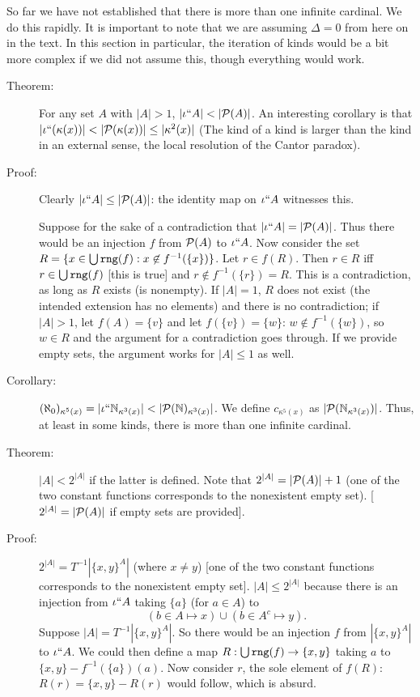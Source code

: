\documentclass[12pt]{article}
\begin{document}
So far we have not established that there is more than one infinite cardinal.  We do this rapidly.  It is important to note that we are assuming $\Delta=0$ from here on in the text.  In this section in particular, the iteration of kinds would be a bit more complex if we did not assume this, though everything would work.

\begin{description}

\item[Theorem:]  For any set $A$ with $|A|>1$, $|\iota``A|<|{\cal P}(A)|$.  An interesting corollary is that $|\iota``(\kappa(x))| < |{\cal P}(\kappa(x))| \leq |\kappa^2(x)|$ (The kind of a kind is larger than the kind in an external sense, the local resolution of the Cantor paradox).

\item[Proof:]  Clearly $|\iota``A|\leq |{\cal P}(A)|$:  the identity map on $\iota``A$ witnesses this.

Suppose for the sake of a contradiction that $|\iota``A|=|{\cal P}(A)|$.  Thus there would be an injection $f$ from ${\cal P}(A)$ to $\iota``A$.  Now consider the set $R = \{x \in \bigcup {\tt rng}(f):x \not\in f^{-1}(\{x\})\}$.  Let $r \in f(R)$.  Then $r \in R$ iff \newline $r \in \bigcup {\tt rng}(f)$ [this is true] and $r \not\in f^{-1}(\{r\}) = R$.  This is a contradiction, as long as $R$ exists (is nonempty).  If $|A|=1$, $R$ does not exist (the intended extension has no elements) and there is no contradiction;
if $|A|>1$, let $f(A)=\{v\}$ and let $f(\{v\}) = \{w\}$:  $w \not\in f^{-1}(\{w\})$, so $w \in R$ and the argument for a contradiction goes through.  If we provide empty sets, the argument works for $|A| \leq 1$ as well.

\item[Corollary:]  $(\aleph_0)_{\kappa^5(x)} = |\iota``{\mathbb N}_{\kappa^3(x)}| < |{\cal P}(\mathbb N)_{\kappa^3(x)}|$.  We define $c_{\kappa^5(x)}$ as $|{\cal P}(\mathbb N_{\kappa^3(x)})|$.  Thus, at least in some kinds, there is more than one infinite cardinal.

\item[Theorem:] $|A|<2^{|A|}$ if the latter is defined.  Note that $2^{|A|}=|{\cal P}(A)|+1$ (one of the two constant functions corresponds to the nonexistent empty set). [$2^{|A|}=|{\cal P}(A)|$ if empty sets are provided].

\item[Proof:]  $2^{|A|}= T^{-1}|\{x,y\}^A|$ (where $x \neq y$) [one of the two constant functions corresponds to the nonexistent empty set].  $|A| \leq 2^{|A|}$ because there is an injection  from $\iota``A$ taking $\{a\}$ (for $a \in A$) to $$(b \in A \mapsto x) \cup (b \in A^c\mapsto y).$$
Suppose $|A| = T^{-1}|\{x,y\}^A|$.  So there would be an injection $f$ from $|\{x,y\}^A|$ to $\iota``A$.  We could then define a map $R:\bigcup {\tt rng}(f) \rightarrow \{x,y\}$ taking $a$ to
$\{x,y\} - f^{-1}(\{a\})(a)$.  Now consider $r$, the sole element of $f(R)$: $R(r) = \{x,y\} - R(r)$ would follow, which is absurd.


\end{description}
\end{document}
